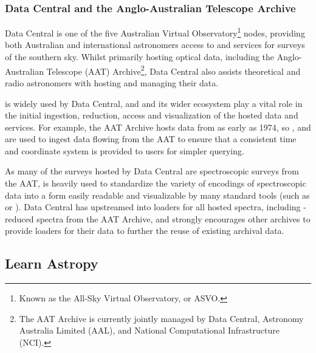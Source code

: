 \documentclass[modern]{aastex631}
\newcommand{\secauthor}[1]{{\color{blue}Author:~\textit{#1}}}
\newcommand{\secunfilled}{{\color{red}Author:~\textit{Looking for volunteers!}}}
\begin{document}
\subsubsection{Data Central and the Anglo-Australian Telescope Archive}
Data Central is one of the five Australian Virtual Observatory\footnote{Known as
  the All-Sky Virtual Observatory, or ASVO.} nodes, providing both Australian and
international astronomers access to and services for surveys of the southern
sky. Whilst primarily hosting optical data, including the Anglo-Australian
Telescope (AAT) Archive\footnote{The AAT Archive is currently jointly managed by
  Data Central, Astronomy Australia Limited (AAL), and National Computational
  Infrastructure (NCI).}, Data Central also assists theoretical and radio
astronomers with hosting and managing their data.

\python is widely used by Data Central, and \astropy and its wider ecosystem
play a vital role in the initial ingestion, reduction, access and visualization
of the hosted data and services. For example, the AAT Archive hosts data from as early as
1974, so \astropycoordinates, \astropytime and \astropyfits are used to ingest
data flowing from the AAT to ensure that a consistent time and coordinate system
is provided to users for simpler querying.

As many of the surveys hosted by Data Central are spectroscopic surveys from the
AAT,  is heavily used to standardize the variety of encodings
of spectroscopic data into a form easily readable and visualizable by many
standard tools (such as  or ). Data Central has
upstreamed into  loaders for all hosted spectra, including
-reduced spectra from the AAT Archive, and strongly encourages other
archives to provide loaders for their data to further the reuse of existing archival
data.



\subsection{Learn Astropy} \label{sec:learn}


\end{document}

